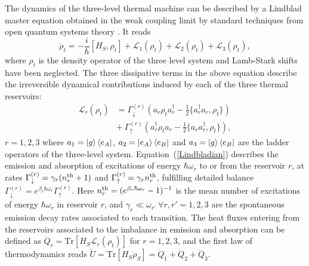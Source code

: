 \documentclass[aps,prx,twocolumn,showpacs,floatfix,superscriptaddress,graphics,longbibliography]{revtex4-1}
\newcommand{\tr}{\mathrm{Tr}}
\begin{document}
The dynamics of the three-level thermal machine  can be described by a Lindblad master equation obtained in the weak 
coupling limit by standard techniques from open quantum systems theory \cite{BreuerBook, Wiseman, Rivas}. It reads
\begin{equation}\label{Meq}
\dot{\rho}_t = -\frac{i}{\hbar}[H_S, \rho_t] + \mathcal{L}_1 (\rho_t) + \mathcal{L}_2 (\rho_t) + \mathcal{L}_3 (\rho_t),
\end{equation}
where $\rho_t$ is the density operator of the three level system and Lamb-Stark shifts have been neglected. The three dissipative terms in the above 
equation describe the irreversible dynamical contributions induced by each of the three thermal reservoirs: 
\begin{align}\label{Lindbladian}
\mathcal{L}_r (\rho_t) & = \Gamma_\downarrow^{(r)}\left(a_r \rho_t a_r^\dagger - \frac{1}{2}\{a_r^\dagger a_r, \rho_t\} \right) \nonumber \\ 
& +~ \Gamma_\uparrow^{(r)} \left(a_r^\dagger \rho_t a_r - \frac{1}{2}\{a_r  a_r^\dagger, \rho_t \} \right),
\end{align}
$r = 1,2, 3$ where $a_1 = \ket{g}\bra{e_A}$, $a_2 = \ket{e_A}\bra{e_B}$ and $a_3 = \ket{g}\bra{e_B}$ are the ladder operators of the three-level 
system. Equation~(\ref{Lindbladian}) describes the emission and absorption of excitations of energy $\hbar \omega_r$ to or from the reservoir $r$, at rates $\Gamma_{\downarrow}^{(r)} = \gamma_r (n_r^{\rm th} +1)$ and $\Gamma_{\uparrow}^{(r)} = \gamma_r n_r^{\rm th}$, 
fulfilling detailed balance $\Gamma_{\downarrow}^{(r)} = e^{\beta_r \hbar \omega_r} \Gamma_{\uparrow}^{(r)}$. Here $n_r^{\rm th} = (e^{\beta_r \hbar \omega_r} - 1)^{-1}$ is the mean number of 
excitations of energy $\hbar \omega_r$ in reservoir $r$, and $\gamma_r \ll \omega_{r'} ~\forall r,r'=1,2,3$ are the spontaneous emission decay rates associated to each transition. 
The heat fluxes entering from the reservoirs associated to the imbalance in emission and absorption can be defined as $\dot{Q}_r = \tr[H_S \mathcal{L}_r(\rho_t)]$ for $r=1,2,3$, and the 
first law of thermodynamics reads $\dot{U} = \tr[H_S \dot{\rho}_S] = \dot{Q}_1 + \dot{Q}_2 + \dot{Q}_3$.
\end{document}

